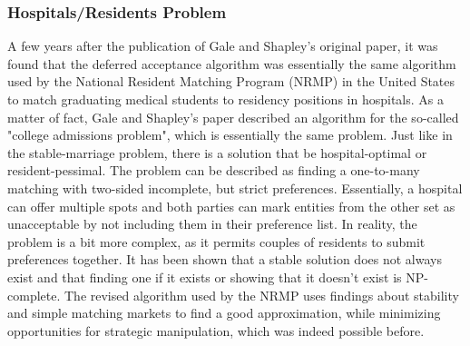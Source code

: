 \subsubsection{Hospitals/Residents Problem}
A few years after the publication of Gale and Shapley's original paper, it was found that the deferred acceptance algorithm was essentially the same algorithm used by the National Resident Matching Program (NRMP) in the United States to match graduating medical students to residency positions in hospitals.\cite{Gusfield} As a matter of fact, Gale and Shapley's paper described an algorithm for the so-called "college admissions problem"\cite{GaleShapleyOrig}, which is essentially the same problem. Just like in the stable-marriage problem, there is a solution that be hospital-optimal or resident-pessimal. 
\newline
The problem can be described as finding a one-to-many matching with two-sided incomplete, but strict preferences. Essentially, a hospital can offer multiple spots and both parties can mark entities from the other set as unacceptable by not including them in their preference list.\cite{RePEc:ris:nobelp:2012_005} 
\newline
In reality, the problem is a bit more complex, as it permits couples of residents to submit preferences together. It has been shown that a stable solution does not always exist and that finding one if it exists or showing that it doesn't exist is NP-complete.\cite{RONN1990285} The revised algorithm used by the NRMP uses findings about stability and simple matching markets to find a good approximation, while minimizing opportunities for strategic manipulation, which was indeed possible before.\cite{NBERw6963}

